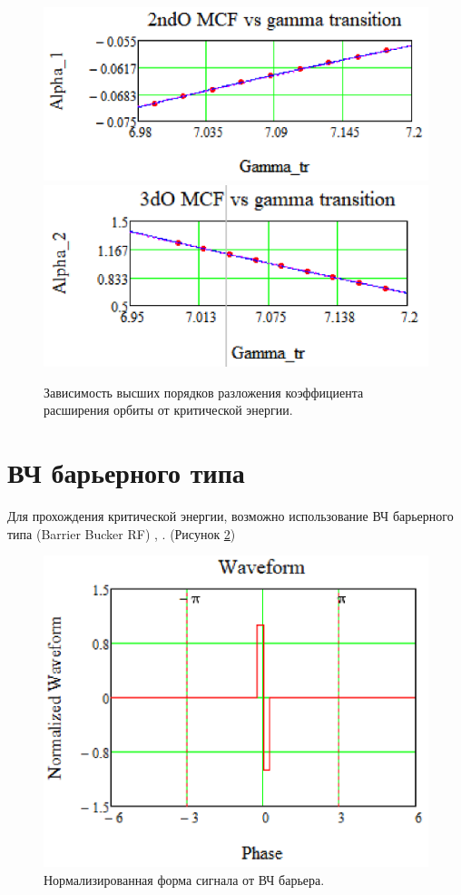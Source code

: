 \documentclass[a4paper,
               keeplastbox,   %
               ]{jacow}
\begin{document}
\begin{figure}[!htb]
   \includegraphics*[width=.49\columnwidth]{img/fig_03-1}
   \includegraphics*[width=.49\columnwidth]{img/fig_03-2}
   \caption{Зависимость высших порядков разложения коэффициента расширения орбиты от критической энергии.}
   \label{fig:alpha}
\end{figure}

\section{ВЧ барьерного типа}

\par Для прохождения критической энергии, возможно использование ВЧ барьерного типа (Barrier Bucker RF) \cite{BB_NICA}, \cite{BB_Mal}. (Рисунок \ref{fig:rf})

\begin{figure}[!htb]
  \centering
   \includegraphics*[width=.75\columnwidth]{img/fig_04-1}
   \caption{Нормализированная форма сигнала от ВЧ барьера.}
   \label{fig:rf}
\end{figure}
\end{document}
